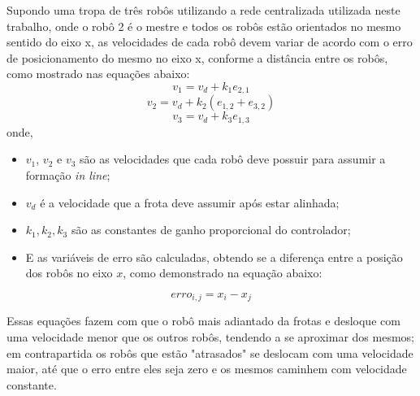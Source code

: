 Supondo uma tropa de três robôs utilizando a rede centralizada utilizada neste trabalho, onde o robô 2 é o mestre e todos os robôs estão orientados no mesmo sentido do eixo x, as velocidades de cada robô devem variar de acordo com o erro de posicionamento do mesmo no eixo x, conforme a distância entre os robôs, como mostrado nas  equações abaixo:
\begin{equation}
v_{1} = v_{d} + k_{1} e_{2,1}
\label{eq:vel1P1}
\end{equation}
\begin{equation}
v_{2} = v_{d} + k_{2} (e_{1,2} + e_{3,2})
\label{eq:vel2P1}
\end{equation}
\begin{equation}
v_{3} = v_{d} + k_{3} e_{1,3}
\label{eq:vel3P1}
\end{equation}
onde,
\begin{itemize}
	\item $v_{1}$, $v_{2}$ e $v_{3}$ são as velocidades que cada robô deve possuir para assumir a formação \emph{in line};
	\item $v_{d}$ é a velocidade que a frota deve assumir após estar alinhada;
	\item $k_{1},k_{2},k_{3}$ são as constantes de ganho proporcional do controlador;
	\item E as variáveis de erro são calculadas, obtendo se a diferença entre a posição dos robôs no eixo $x$, como demonstrado na equação abaixo:	
\end{itemize}
\begin{equation}
erro_{i,j} = x_{i} - x_{j}
\label{eq:errp1}
\end{equation}

 Essas equações fazem com que o robô mais adiantado da frotas e desloque com uma velocidade menor que os outros robôs, tendendo a se aproximar dos mesmos; em contrapartida os robôs que estão "atrasados" se deslocam com uma velocidade maior, até que o erro entre eles seja zero e os mesmos caminhem com velocidade constante. 

